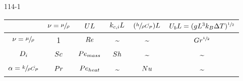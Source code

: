 \begin{mitframe}{114-1}



\begin{longtable}{ | c | c | c | c | c | c | } 
 \hline
    & $\freq = \sfrac{\chempot}{\dens}$
    & $\uvel\length$ 
    & $\masstranscoeff\length$ 
    & $(\sfrac{\planck}{\dens\hat{\cp}})\length$
    & $\uvel_{b}\length = (\grav\length^{3}\boltz\iipf\Temp)^{\sfrac{1}{2}}$
    \\
    \hline
    $\freq = \sfrac{\chempot}{\dens}$ & 1 & $\reynolds$ & \textasciitilde & \textasciitilde & $\grashof^{\sfrac{1}{2}}$ \\ \hline
    $\pdiff$ & $\schmidt$ & $\peclet_{mass}$ & $\sherwood$ & \textasciitilde & \textasciitilde \\ \hline    
    $\tdiff = \sfrac{\thermcond}{\dens\hat{\cp}}$ & $\prandtl$ & $\peclet_{heat}$ & \textasciitilde & $\nusselt$ & \textasciitilde \\ \hline   

 
\end{longtable}

\end{mitframe}